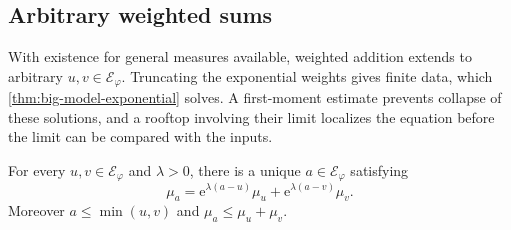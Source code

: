 \subsection{Arbitrary weighted sums}
\label{sec:big-unrestricted-addition}

With existence for general measures available, weighted addition extends to arbitrary $u,v\in\mathcal E_\varphi$. Truncating the exponential weights gives finite data, which \cref{thm:big-model-exponential} solves. A first-moment estimate prevents collapse of these solutions, and a rooftop involving their limit localizes the equation before the limit can be compared with the inputs.

\begin{theorem}\label{thm:big-unrestricted-addition}
For every $u,v\in\mathcal E_\varphi$ and $\lambda>0$, there is a unique $a\in\mathcal E_\varphi$ satisfying
\[
 \mu_a=\mathrm{e}^{\lambda(a-u)}\mu_u+\mathrm{e}^{\lambda(a-v)}\mu_v.
\]
Moreover $a\leq\min(u,v)$ and $\mu_a\leq\mu_u+\mu_v$.
\end{theorem}

